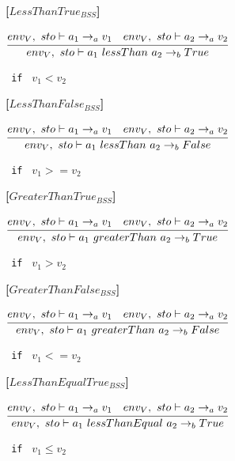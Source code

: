 \textbf{[$LessThanTrue_{BSS}$]}
\begin{center}
	\begin{math}
	\cfrac
	{env_V,\ sto \vdash a_1 \rightarrow_a v_1 \quad env_V,\ sto \vdash a_2 \rightarrow_a v_2}
	{env_V,\ sto \vdash a_1\ lessThan\ a_2 \rightarrow_b True}
	\end{math}
	
	\texttt{ if } $v_1 < v_2$
\end{center}

\textbf{[$LessThanFalse_{BSS}$]}
\begin{center}
	\begin{math}
	\cfrac
	{env_V,\ sto \vdash a_1 \rightarrow_a v_1 \quad env_V,\ sto \vdash a_2 \rightarrow_a v_2}
	{env_V,\ sto \vdash a_1\ lessThan\ a_2 \rightarrow_b False}
	\end{math}
	
	\texttt{ if } $v_1 >= v_2$
\end{center}

\textbf{[$GreaterThanTrue_{BSS}$]}
\begin{center}
	\begin{math}
	\cfrac
	{env_V,\ sto \vdash a_1 \rightarrow_a v_1 \quad env_V,\ sto \vdash a_2 \rightarrow_a v_2}
	{env_V,\ sto \vdash a_1\ greaterThan\ a_2 \rightarrow_b True}
	\end{math}
	
	\texttt{ if } $v_1 > v_2$
\end{center}

\textbf{[$GreaterThanFalse_{BSS}$]}
\begin{center}
	\begin{math}
	\cfrac
	{env_V,\ sto \vdash a_1 \rightarrow_a v_1 \quad env_V,\ sto \vdash a_2 \rightarrow_a v_2}
	{env_V,\ sto \vdash a_1\ greaterThan\ a_2 \rightarrow_b False}
	\end{math}
	
	\texttt{ if } $v_1 <= v_2$
\end{center}

\textbf{[$LessThanEqualTrue_{BSS}$]}
\begin{center}
	\begin{math}
	\cfrac
	{env_V,\ sto \vdash a_1 \rightarrow_a v_1 \quad env_V,\ sto \vdash a_2 \rightarrow_a v_2}
	{env_V,\ sto \vdash a_1\ lessThanEqual\ a_2 \rightarrow_b True}
	\end{math}
	
	\texttt{ if } $v_1 \leq v_2$
\end{center}

